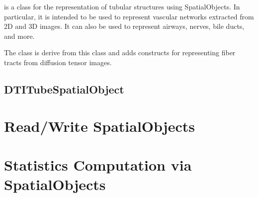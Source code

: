  is a class for the representation
of tubular structures using SpatialObjects.  In particular, it is intended
to be used to represent vascular networks extracted from 2D and 3D images. 
It can also be used to represent airways, nerves, bile ducts, and more.

 The class  is derive from this class
and adds constructs for representing fiber tracts from diffusion tensor images.

\label{sec:TubeSpatialObject}



\subsection{DTITubeSpatialObject}
\label{sec:DTITubeSpatialObject}



\section{Read/Write SpatialObjects}
\label{sec:ReadWriteSpatialObjects}



\section{Statistics Computation via SpatialObjects}
\label{sec:SpatialObjectToImageStatisticsCalculator}


